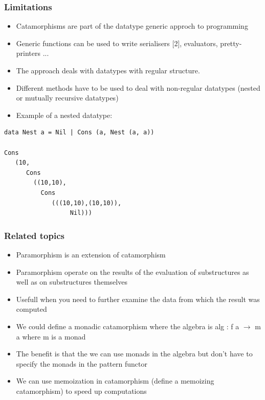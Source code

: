 \documentclass[10pt]{beamer}
\begin{document}
\begin{frame}[fragile]
\frametitle{Limitations}

\begin{itemize}
\item Catamorphisms are part of the datatype generic approch to programming 
\item Generic functions can be used to write serialisers [2], evaluators, pretty-printers ... 
\item The approach deals with datatypes with regular structure.
\item Different methods have to be used to deal with non-regular datatypes (nested or mutually recursive datatypes) 	
\item Example of a nested datatype:	
\end{itemize}

\begin{lstlisting}
data Nest a = Nil | Cons (a, Nest (a, a))

Cons 
   (10,
      Cons 
        ((10,10),
          Cons 
             (((10,10),(10,10)),
                  Nil)))
\end{lstlisting}

\end{frame}




\begin{frame}[fragile]
\frametitle{Related topics}

\begin{itemize}
\item Paramorphism is an extension of catamorphism
\item Paramorphism operate on the results of the evaluation of substructures as well as on substructures themselves	
\item Usefull when you need to further examine the data from which the result was computed	
\item We could define a monadic catamorphism where the algebra is alg : f a $\rightarrow$ m a where m is a monad 
\item The benefit is that the we can use monads in the algebra but don't have to specify the monads in the pattern functor
\item We can use memoization in catamorphism (define a memoizing catamorphism) to speed up computations
\end{itemize}

\end{frame}
\end{document}
